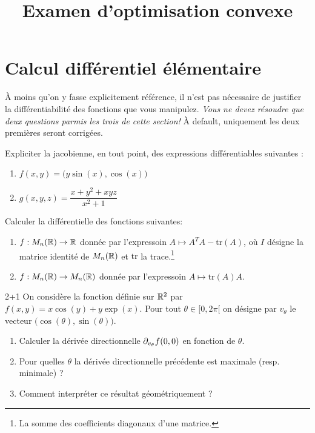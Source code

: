 \documentclass[11pt, a4paper]{article}
\title{%
  { \huge Examen d'optimisation convexe}%
}
\author{}
\date{}
\begin{document}
\maketitle\thispagestyle{fancy}

\section{Calcul différentiel élémentaire}

À moins qu'on y fasse explicitement référence, il n'est pas nécessaire
de justifier la différentiabilité des fonctions que vous
manipulez. \emph{Vous ne devez résoudre que deux questions parmis les
  trois de cette section!} À default, uniquement les deux premières
seront corrigées.

\begin{question}{2}
  Expliciter la jacobienne, en tout point, des expressions
  différentiables suivantes :
  \begin{enumerate}
  \item $f(x, y) = \big(y\sin(x), \cos(x)\big)$
  \item $g(x, y, z) = \dfrac{x + y^2 + xyz}{x^2+1}$
  \end{enumerate}
\end{question}

\begin{question}{3}
  Calculer la différentielle des fonctions suivantes:
  \begin{enumerate}
  \item $f : M_n(\mathbb{R}) \rightarrow \mathbb{R}$ donnée par l'expressoin
    $A \mapsto A^TA - \mathrm{tr}(A)$, où $I$ désigne la matrice
    identité de $M_n(\mathbb{R})$ et $\mathrm{tr}$ la trace.\footnote{La somme
      des coefficients diagonaux d'une matrice.}
  \item $f : M_n(\mathbb{R}) \rightarrow M_n(\mathbb{R})$ donnée par l'expressoin
    $A \mapsto \mathrm{tr}(A)A$.
  \end{enumerate}
\end{question}

\begin{question}{2+1}
  On considère la fonction définie sur $\mathbb{R}^2$ par
  $f(x, y) = x\cos(y) + y\exp(x)$. Pour tout $\theta \in [0, 2\pi[$ on
  désigne par $v_\theta$ le vecteur
  $\big(\cos(\theta), \sin(\theta)\big)$.
  \begin{enumerate}
  \item Calculer la dérivée directionnelle $\partial_{v_\theta}f(0, 0)$ en fonction de $\theta$.
  \item Pour quelles $\theta$ la dérivée directionnelle précédente est maximale (resp. minimale) ?
  \item Comment interpréter ce résultat géométriquement ?
  \end{enumerate}
\end{question}
\end{document}
